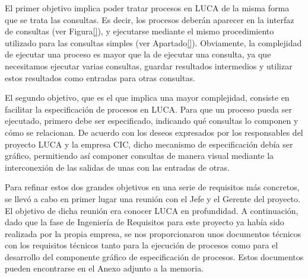 El primer objetivo implica poder tratar procesos en LUCA de la misma forma que se trata las consultas. Es decir, los procesos deberán aparecer en la interfaz de consultas (ver Figura\ref{}), y ejecutarse mediante el mismo procedimiento utilizado para las consultas simples (ver Apartado\ref{}). Obviamente, la complejidad de ejecutar una proceso es mayor que la de ejecutar una consulta, ya que necesitamos ejecutar varias consultas, guardar resultados intermedios y utilizar estos resultados como entradas para otras consultas.

El segundo objetivo, que es el que implica una mayor complejidad, consiste en facilitar la especificación de procesos en LUCA. Para que un proceso pueda ser ejecutado, primero debe ser especificado, indicando qué consultas lo componen y cómo se relacionan. De acuerdo con los deseos expresados por los responsables del proyecto LUCA y la empresa CIC, dicho mecanismo de especificación debía ser gráfico, permitiendo así componer consultas de manera visual mediante la interconexión de las salidas de unas con las entradas de otras.

Para refinar estos dos grandes objetivos en una serie de requisitos más concretos, se llevó a cabo en primer lugar una reunión con el Jefe y el Gerente del proyecto. El objetivo de dicha reunión era conocer LUCA en profundidad. A continuación, dado que la fase de Ingeniería de Requisitos para este proyecto ya había sido realizada por la propia empresa, se nos proporcionaron unos documentos técnicos con los requisitos técnicos tanto para la ejecución de procesos como para el desarrollo del componente gráfico de especificación de procesos. Estos documentos pueden encontrarse en el Anexo adjunto a la memoria.





